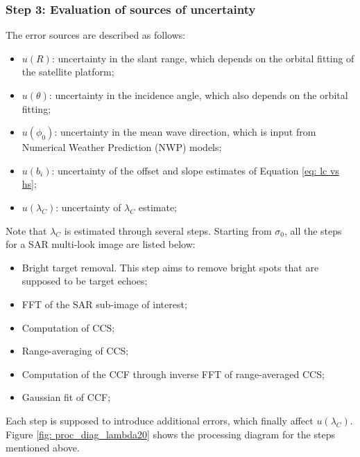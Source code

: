 \subsubsection{Step 3: Evaluation of sources of uncertainty}
\label{sec: Hs effects}

The error sources are described as follows:
\begin{itemize}
    \item $u(R)$: uncertainty in the slant range, which depends on the orbital fitting of the satellite platform;
    \item $u(\theta)$: uncertainty in the incidence angle, which also depends on the orbital fitting;
    \item $u(\phi_{0})$: uncertainty in the mean wave direction, which is input from Numerical Weather Prediction (\ac{NWP}) models;
	\item $u(b_{i})$: uncertainty of the offset and slope estimates of Equation \ref{eq: lc vs hs};
	\item $u(\lambda_{C})$: uncertainty of $\lambda_{C}$ estimate;
\end{itemize}

Note that $\lambda_{C}$ is estimated through several steps. Starting from
$\sigma_{0}$, all the steps for a SAR multi-look image are listed below:
\begin{itemize}
	\item Bright target removal. This step aims to remove bright spots that are supposed to be target echoes;
        \item \ac{FFT} of the \ac{SAR} sub-image of interest;
        \item Computation of \ac{CCS};
        \item Range-averaging of \ac{CCS};
        \item Computation of the \ac{CCF} through inverse \ac{FFT} of range-averaged \ac{CCS};
        \item Gaussian fit of \ac{CCF};
\end{itemize}

\noindent Each step is supposed to introduce additional errors, which finally affect $u(\lambda_{C})$. Figure \ref{fig: proc_diag_lambda20} shows the processing diagram for the steps mentioned above.

